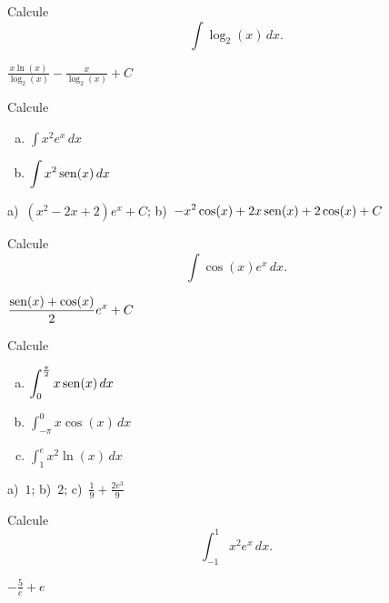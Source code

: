 \begin{exer}
  Calcule
  \begin{equation}
    \int\log_2(x)\,dx.
  \end{equation}
\end{exer}
\begin{resp}
  $\displaystyle \frac{x\ln(x)}{\log_2(x)}-\frac{x}{\log_2(x)} + C$
\end{resp}

\begin{exer}
  Calcule
  \begin{enumerate}[a)]
  \item $\displaystyle \int x^2e^x\,dx$
  \item $\displaystyle \int x^2\operatorname{sen}(x)\,dx$
  \end{enumerate}
\end{exer}
\begin{resp}
  a)~$\displaystyle \left(x^2-2x+2\right)e^x+C$; b)~$\displaystyle -x^2\cos(x)+2x\operatorname{sen}(x)+2\cos(x)+C$
\end{resp}

\begin{exer}
  Calcule
  \begin{equation}
    \int\cos(x)e^x\,dx.
  \end{equation}
\end{exer}
\begin{resp}
  $\displaystyle \frac{\operatorname{sen}(x)+\cos(x)}{2}e^x + C$
\end{resp}

\begin{exer}
  Calcule
  \begin{enumerate}[a)]
  \item $\displaystyle \int_0^{\frac{\pi}{2}} x\operatorname{sen}(x)\,dx$
  \item $\displaystyle \int_{-\pi}^{0} x\cos(x)\,dx$
  \item $\displaystyle \int_1^e x^2\ln(x)\,dx$
  \end{enumerate}
\end{exer}
\begin{resp}
  a)~$1$; b)~$2$;  c)~$\displaystyle \frac{1}{9}+\frac{2e^3}{9}$
\end{resp}

\begin{exer}
  Calcule
  \begin{equation}
    \int_{-1}^1 x^2e^x\,dx.
  \end{equation}
\end{exer}
\begin{resp}
  $-\frac{5}{e}+e$
\end{resp}

